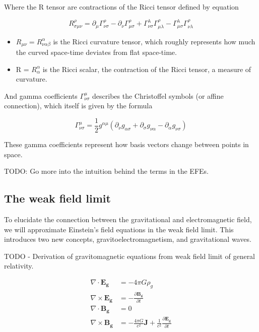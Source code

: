 Where the R tensor are contractions of the Ricci tensor defined by equation 

\begin{equation}
    R_{\sigma \mu \nu }^{\rho }=\partial_{\mu} \Gamma _{\nu \sigma }^{\rho }-\partial_\nu \Gamma _{\mu \sigma }^{\rho }+\Gamma _{\nu \sigma }^{\lambda } \Gamma _{\mu \lambda }^{\rho }-\Gamma _{\mu \sigma }^{\lambda } \Gamma _{\nu \lambda }^{\rho }
\label{eq:Riemann tesnor}
\end{equation}


\begin{itemize}
    \item $R_{\mu \nu} = R^{\alpha}_{\nu \alpha \beta}$ is the Ricci curvature tensor, which roughly represents how much the curved space-time deviates from flat space-time.
    \item R = $R^{\alpha}_{\alpha}$ is the Ricci scalar, the contraction of the Ricci tensor, a measure of curvature.
\end{itemize}

And gamma coefficients $\Gamma^{\mu}_{\nu \sigma}$ describes the Christoffel symbols (or affine connection), which itself is given by the formula

\begin{equation}
    \Gamma^{\mu}_{\nu \sigma} = \frac{1}{2} g^{\alpha \mu} (\partial_{\nu}g_{\alpha \sigma}+\partial_{\sigma} g_{\nu \alpha} - \partial_{\alpha} g_{\nu \sigma})
\label{eq:Christoffel symbol}
\end{equation}

These gamma coefficients represent how basis vectors change between points in space.

TODO: Go more into the intuition behind the terms in the EFEs.

\subsection{The weak field limit}

To elucidate the connection between the gravitational and electromagnetic field, we will approximate Einstein's field equations in the weak field limit. This introduces two new concepts, gravitoelectromagnetism, and gravitational waves.

TODO - Derivation of gravitomagnetic equations from weak field limit of general relativity.

\begin{align}\label{eq:Gravitomagnetic equations}
    \nabla \cdot \mathbf{E_g} &= - 4\pi G \rho_g \\
    \nabla \times \mathbf{E_g} &= - \frac{\partial \mathbf{B_g}}{\partial t}\label{eq:Gravitomag grad E} \\
    \nabla \cdot \mathbf{B_g} &= 0 \\
    \nabla \times \mathbf{B_g} &= - \frac{4\pi G}{c^2} \mathbf{J} + \frac{1}{c^2} \frac{\partial \mathbf{E_g}}{\partial t}\label{eq:Gravitomag Partial E}
\end{align}

